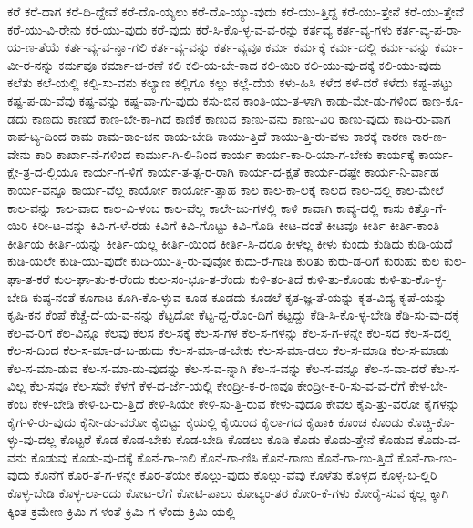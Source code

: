 {ಕರೆ
ಕರೆ-ದಾಗ
ಕರೆ-ದಿ-ದ್ದೇವೆ
ಕರೆ-ದೊ-ಯ್ಯಲು
ಕರೆ-ದೊ-ಯ್ಯು-ವುದು
ಕರೆ-ಯು-ತ್ತಿದ್ದ
ಕರೆ-ಯು-ತ್ತೇನೆ
ಕರೆ-ಯು-ತ್ತೇವೆ
ಕರೆ-ಯು-ವಿ-ರೇನು
ಕರೆ-ಯು-ವುದು
ಕರೆ-ವುದು
ಕರೆ-ಸಿ-ಕೊ-ಳ್ಳ-ವ-ವ-ರನ್ನು
ಕರ್ತವ್ಯ
ಕರ್ತ-ವ್ಯ-ಗಳು
ಕರ್ತ-ವ್ಯ-ಪ-ರಾ-ಯ-ಣ-ತೆಯೆ
ಕರ್ತ-ವ್ಯ-ವ-ನ್ನಾ-ಗಲಿ
ಕರ್ತ-ವ್ಯ-ವನ್ನು
ಕರ್ತ-ವ್ಯವೂ
ಕರ್ಮ
ಕರ್ಮಕ್ಕೆ
ಕರ್ಮ-ದಲ್ಲಿ
ಕರ್ಮ-ವನ್ನು
ಕರ್ಮ-ವೀ-ರ-ನನ್ನು
ಕರ್ಮವೂ
ಕರ್ಮಾ-ಚ-ರಣೆ
ಕಲಿ
ಕಲಿ-ಯ-ಬೇ-ಕಾದ
ಕಲಿ-ಯಿರಿ
ಕಲಿ-ಯು-ವು-ದಕ್ಕೆ
ಕಲಿ-ಯು-ವುದು
ಕಲೆತು
ಕಲೆ-ಯಲ್ಲಿ
ಕಲ್ಪಿ-ಸು-ವನು
ಕಲ್ಯಾಣ
ಕಲ್ಲಿಗೂ
ಕಲ್ಲು
ಕಲ್ಲೆ-ದೆಯ
ಕಳು-ಹಿಸಿ
ಕಳೆದ
ಕಳೆ-ದರೆ
ಕಳೆದು
ಕಷ್ಟ-ಪಟ್ಟು
ಕಷ್ಟ-ಪ-ಡು-ವೆವು
ಕಷ್ಟ-ವನ್ನು
ಕಷ್ಟ-ವಾ-ಗು-ವುದು
ಕಸು-ಬಿನ
ಕಾಂತಿ-ಯು-ತ-ಳಾಗಿ
ಕಾಡು-ಮೇ-ಡು-ಗಳಿಂದ
ಕಾಣ-ಕೂ-ಡದು
ಕಾಣದು
ಕಾಣದೆ
ಕಾಣ-ಬೇ-ಕಾ-ಗಿದೆ
ಕಾಣಿಕೆ
ಕಾಣುವ
ಕಾಣು-ವನು
ಕಾಣು-ವಿರಿ
ಕಾಣು-ವುದು
ಕಾದಿ-ರು-ವಾಗ
ಕಾಪ-ಟ್ಯ-ದಿಂದ
ಕಾಮ
ಕಾಮ-ಕಾಂ-ಚನ
ಕಾಯ-ಬೇಡಿ
ಕಾಯು-ತ್ತಿದೆ
ಕಾಯು-ತ್ತಿ-ರು-ವಳು
ಕಾರಕ್ಕೆ
ಕಾರಣ
ಕಾರ-ಣ-ವೇನು
ಕಾರಿ
ಕಾರ್ಖಾ-ನೆ-ಗಳಿಂದ
ಕಾರ್ಮು-ಗಿ-ಲಿ-ನಿಂದ
ಕಾರ್ಯ
ಕಾರ್ಯ-ಕಾ-ರಿ-ಯಾ-ಗ-ಬೇಕು
ಕಾರ್ಯಕ್ಕೆ
ಕಾರ್ಯ-ಕ್ಷೇ-ತ್ರ-ದ-ಲ್ಲಿಯೂ
ಕಾರ್ಯ-ಗ-ಳಿಗೆ
ಕಾರ್ಯ-ತ-ತ್ಪ-ರ-ರಾಗಿ
ಕಾರ್ಯ-ದ-ಕ್ಷತೆ
ಕಾರ್ಯ-ದಷ್ಟೇ
ಕಾರ್ಯ-ನಿ-ರ್ವಾಹ
ಕಾರ್ಯ-ವನ್ನೂ
ಕಾರ್ಯ-ವೆಲ್ಲ
ಕಾರ್ಯೋ
ಕಾರ್ಯೋ-ತ್ಸಾಹ
ಕಾಲ
ಕಾಲ-ಕಾ-ಲಕ್ಕೆ
ಕಾಲದ
ಕಾಲ-ದಲ್ಲಿ
ಕಾಲ-ಮೇಲೆ
ಕಾಲ-ವನ್ನು
ಕಾಲ-ವಾದ
ಕಾಲ-ವಿ-ಳಂಬ
ಕಾಲ-ವೆಲ್ಲ
ಕಾಲೇ-ಜು-ಗಳಲ್ಲಿ
ಕಾಳಿ
ಕಾವಾಗಿ
ಕಾವ್ಯ-ದಲ್ಲಿ
ಕಾಸು
ಕಿತ್ತೊ-ಗೆ-ಯಿರಿ
ಕಿರೀ-ಟ-ವನ್ನು
ಕಿವಿ-ಗ-ಳೆ-ರಡು
ಕಿವಿಗೆ
ಕಿವಿ-ಗೊಟ್ಟು
ಕಿವಿ-ಗೊಡಿ
ಕೀಟ-ದಂತೆ
ಕೀಟವೂ
ಕೀರ್ತಿ
ಕೀರ್ತಿ-ಕಾಂತಿ
ಕೀರ್ತಿಯ
ಕೀರ್ತಿ-ಯನ್ನು
ಕೀರ್ತಿ-ಯಲ್ಲ
ಕೀರ್ತಿ-ಯಿಂದ
ಕೀರ್ತಿ-ಸಿ-ದರೂ
ಕೀಳಲ್ಲ
ಕೀಳು
ಕುಂದು
ಕುಡಿದು
ಕುಡಿ-ಯದೆ
ಕುಡಿ-ಯಲೇ
ಕುಡಿ-ಯು-ವುದೇ
ಕುದಿ-ಯು-ತ್ತಿ-ರು-ವುವೋ
ಕುದು-ರೆ-ಗಾಡಿ
ಕುರಿತು
ಕುರು-ಡ-ರಿಗೆ
ಕುರುಹು
ಕುಲ
ಕುಲ-ಘಾ-ತ-ಕರೆ
ಕುಲ-ಘಾ-ತು-ಕ-ರೆಂದು
ಕುಲ-ಸಂ-ಭೂ-ತ-ರೆಂದು
ಕುಳಿ-ತಂ-ತಿದೆ
ಕುಳಿ-ತು-ಕೊಂಡು
ಕುಳಿ-ತು-ಕೊ-ಳ್ಳ-ಬೇಡಿ
ಕುಷ್ಠ-ನಂತೆ
ಕೂಗಾಟ
ಕೂಗಿ-ಕೊ-ಳ್ಳುವ
ಕೂಡ
ಕೂಡದು
ಕೂಡಲೆ
ಕೃತ-ಜ್ಞ-ತೆ-ಯನ್ನು
ಕೃತ-ವಿದ್ಯ
ಕೃಪೆ-ಯನ್ನು
ಕೃಷಿ-ಕನ
ಕೆಂಪೆ
ಕೆಚ್ಚೆ-ದೆ-ಯ-ವ-ನನ್ನು
ಕೆಟ್ಟದೋ
ಕೆಟ್ಟ-ದ್ದ-ರೊಂ-ದಿಗೆ
ಕೆಟ್ಟದ್ದು
ಕೆಡಿ-ಸಿ-ಕೊ-ಳ್ಳ-ಬೇಡಿ
ಕೆಡಿ-ಸು-ವು-ದಕ್ಕೆ
ಕೆಲ-ವ-ರಿಗೆ
ಕೆಲ-ವಿನ್ನೂ
ಕೆಲವು
ಕೆಲಸ
ಕೆಲ-ಸಕ್ಕೆ
ಕೆಲ-ಸ-ಗಳ
ಕೆಲ-ಸ-ಗಳನ್ನು
ಕೆಲ-ಸ-ಗ-ಳನ್ನೇ
ಕೆಲ-ಸದ
ಕೆಲ-ಸ-ದಲ್ಲಿ
ಕೆಲ-ಸ-ದಿಂದ
ಕೆಲ-ಸ-ಮಾ-ಡ-ಬ-ಹುದು
ಕೆಲ-ಸ-ಮಾ-ಡ-ಬೇಕು
ಕೆಲ-ಸ-ಮಾ-ಡಲು
ಕೆಲ-ಸ-ಮಾಡಿ
ಕೆಲ-ಸ-ಮಾಡು
ಕೆಲ-ಸ-ಮಾ-ಡುವ
ಕೆಲ-ಸ-ಮಾ-ಡು-ವುದನ್ನು
ಕೆಲ-ಸ-ವ-ನ್ನಾಗಿ
ಕೆಲ-ಸ-ವನ್ನು
ಕೆಲ-ಸ-ವನ್ನೂ
ಕೆಲ-ಸ-ವಾ-ದರೆ
ಕೆಲ-ಸ-ವಿಲ್ಲ
ಕೆಲ-ಸವೂ
ಕೆಲ-ಸವೇ
ಕೆಳಗೆ
ಕೆಳ-ದ-ರ್ಜೆ-ಯಲ್ಲಿ
ಕೇಂದ್ರೀ-ಕ-ರ-ಣವೂ
ಕೇಂದ್ರೀ-ಕ-ರಿ-ಸು-ವ-ವ-ರೆಗೆ
ಕೇಳ-ಬೇ-ಕೆಂಬ
ಕೇಳ-ಬೇಡಿ
ಕೇಳಿ-ಬ-ರು-ತ್ತಿದೆ
ಕೇಳಿ-ಸಿಯೇ
ಕೇಳಿ-ಸು-ತ್ತಿ-ರುವ
ಕೇಳು-ವುದೂ
ಕೇವಲ
ಕೈಎ-ತ್ತು-ವರೋ
ಕೈಗಳನ್ನು
ಕೈಗ-ಳಿ-ರು-ವುದು
ಕೈನೀ-ಡು-ವರೋ
ಕೈಬಿಟ್ಟು
ಕೈಯಲ್ಲಿ
ಕೈಯಿಂದ
ಕೈಲಾ-ಗದ
ಕೈಹಾಕಿ
ಕೊಂಚ
ಕೊಂಡು
ಕೊಚ್ಚಿ-ಕೊ-ಳ್ಳು-ವು-ದಲ್ಲ
ಕೊಟ್ಟರೆ
ಕೊಡ
ಕೊಡ-ಬೇಕು
ಕೊಡ-ಬೇಡಿ
ಕೊಡಲು
ಕೊಡಿ
ಕೊಡು
ಕೊಡು-ತ್ತೇನೆ
ಕೊಡುವ
ಕೊಡು-ವ-ವನು
ಕೊಡುವು
ಕೊಡು-ವು-ದಕ್ಕೆ
ಕೊನೆ-ಗಾ-ಣಲಿ
ಕೊನೆ-ಗಾ-ಣಿಸಿ
ಕೊನೆ-ಗಾಣು
ಕೊನೆ-ಗಾ-ಣು-ತ್ತಿದೆ
ಕೊನೆ-ಗಾ-ಣು-ವುದು
ಕೊನೆಗೆ
ಕೊರ-ತೆ-ಗ-ಳನ್ನೇ
ಕೊರ-ತೆಯೇ
ಕೊಲ್ಲು-ವುದು
ಕೊಲ್ಲು-ವೆವು
ಕೊಳೆತು
ಕೊಳ್ಳದ
ಕೊಳ್ಳ-ಬ-ಲ್ಲಿರಿ
ಕೊಳ್ಳ-ಬೇಡಿ
ಕೊಳ್ಳ-ಲಾ-ರದು
ಕೋಟ-ಲೆಗೆ
ಕೋಟಿ-ಪಾಲು
ಕೋಟ್ಯಂ-ತರ
ಕೋರಿ-ಕೆ-ಗಳು
ಕೋರೈ-ಸುವ
ಕ್ಕಲ್ಲ
ಕ್ಕಾಗಿ
ಕ್ಕಿಂತ
ಕ್ರಮೇಣ
ಕ್ರಿಮಿ-ಗ-ಳಂತೆ
ಕ್ರಿಮಿ-ಗ-ಳೆಂದು
ಕ್ರಿಮಿ-ಯಲ್ಲಿ
}
